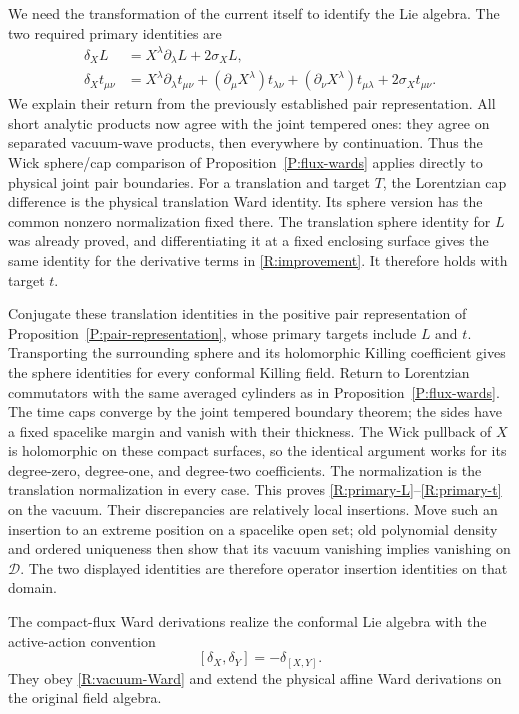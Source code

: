 We need the transformation of the current itself to identify the
Lie algebra.  The two required primary identities are
\begin{align}
 \delta_X L&=X^\lambda\partial_\lambda L+2\sigma_XL,
                         \label{R:primary-L}\\
 \delta_X t_{\mu\nu}
   &=X^\lambda\partial_\lambda t_{\mu\nu}
      +(\partial_\mu X^\lambda)t_{\lambda\nu}
      +(\partial_\nu X^\lambda)t_{\mu\lambda}
      +2\sigma_Xt_{\mu\nu}. \label{R:primary-t}
\end{align}
We explain their return from the previously established pair
representation.  All short analytic products now agree with the
joint tempered ones: they agree on separated vacuum-wave products,
then everywhere by continuation.  Thus the Wick sphere/cap
comparison of Proposition~\ref{P:flux-wards} applies directly to
physical joint pair boundaries.  For a translation and target $T$,
the Lorentzian cap difference is the physical translation Ward
identity.  Its sphere version has the common nonzero normalization
fixed there.  The translation sphere identity for $L$ was already
proved, and differentiating it at a fixed enclosing surface gives
the same identity for the derivative terms in
\eqref{R:improvement}.  It therefore holds with target $t$.

Conjugate these translation identities in the positive pair
representation of Proposition~\ref{P:pair-representation}, whose
primary targets include $L$ and $t$.  Transporting the surrounding
sphere and its holomorphic Killing coefficient gives the sphere
identities for every conformal Killing field.  Return to Lorentzian
commutators with the same averaged cylinders as in
Proposition~\ref{P:flux-wards}.  The time caps converge by the joint
tempered boundary theorem; the sides have a fixed spacelike margin
and vanish with their thickness.  The Wick pullback of $X$ is
holomorphic on these compact surfaces, so the identical argument
works for its degree-zero, degree-one, and degree-two coefficients.
The normalization is the translation normalization in every case.
This proves \eqref{R:primary-L}--\eqref{R:primary-t} on the vacuum.
Their discrepancies are relatively local insertions.  Move such an
insertion to an extreme position on a spacelike open set; old
polynomial density and ordered uniqueness then show that its vacuum
vanishing implies vanishing on $\mathcal D$.  The two displayed
identities are therefore operator insertion identities on that
domain.

\begin{proposition}\label{R:Ward-Lie}
The compact-flux Ward derivations realize the conformal Lie algebra
with the active-action convention
\begin{equation}\label{R:Lie-sign}
 [\delta_X,\delta_Y]=-\delta_{[X,Y]}.
\end{equation}
They obey \eqref{R:vacuum-Ward} and extend the physical affine Ward
derivations on the original field algebra.
\end{proposition}

